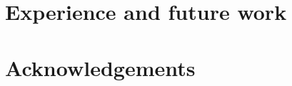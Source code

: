 \documentclass[10pt,preprint]{sigplanconf}
\begin{document}
\section{Experience and future work}

\section*{Acknowledgements}



\printbibliography
\end{document}
